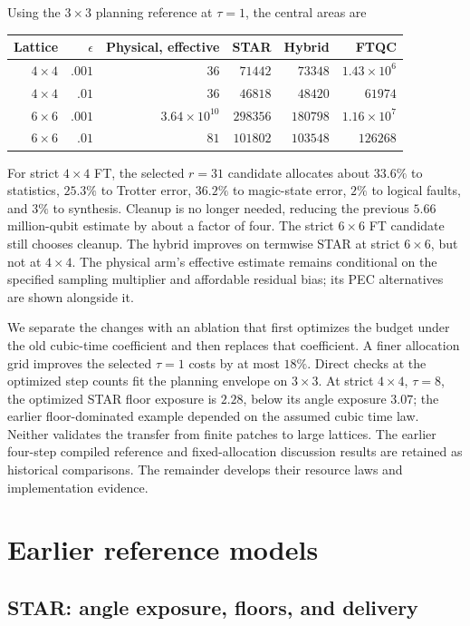 \documentclass[11pt]{article}
\newcommand{\eps}{\epsilon}
\begin{document}
Using the $3\times3$ planning reference at $\tau=1$, the central areas are
\begin{center}
\small
\begin{tabular}{rrrrrr}
\toprule
Lattice & $\eps$ & Physical, effective & STAR & Hybrid & FTQC\\
\midrule
$4\times4$ & $.001$ & $36$ & $71442$ & $73348$ & $1.43\times10^6$\\
$4\times4$ & $.01$ & $36$ & $46818$ & $48420$ & $61974$\\
$6\times6$ & $.001$ & $3.64\times10^{10}$ & $298356$ & $180798$ & $1.16\times10^7$\\
$6\times6$ & $.01$ & $81$ & $101802$ & $103548$ & $126268$\\
\bottomrule
\end{tabular}
\end{center}
For strict $4\times4$ FT, the selected $r=31$ candidate allocates about
$33.6\%$ to statistics, $25.3\%$ to Trotter error, $36.2\%$ to magic-state
error, $2\%$ to logical faults, and $3\%$ to synthesis. Cleanup is no longer
needed, reducing the previous $5.66$ million-qubit estimate by about a
factor of four. The strict $6\times6$ FT candidate still chooses cleanup.
The hybrid improves on termwise STAR at strict $6\times6$, but not at
$4\times4$. The physical arm's effective estimate remains conditional on the specified
sampling multiplier and affordable residual bias; its PEC alternatives are
shown alongside it.

We separate the changes with an ablation that first optimizes the budget
under the old cubic-time coefficient and then replaces that coefficient.
A finer allocation grid improves the selected $\tau=1$ costs by at most
$18\%$. Direct checks at the optimized step counts fit the planning
envelope on $3\times3$. At strict $4\times4$, $\tau=8$, the optimized
STAR floor exposure is $2.28$, below its angle exposure $3.07$; the earlier
floor-dominated example depended on the assumed cubic time law. Neither validates
the transfer from finite patches to large lattices. The earlier four-step
compiled reference and fixed-allocation discussion results are retained as
historical comparisons. The remainder develops their resource laws and
implementation evidence.

\section{Earlier reference models}\label{sup:models}
\subsection{STAR: angle exposure, floors, and delivery}
\end{document}
